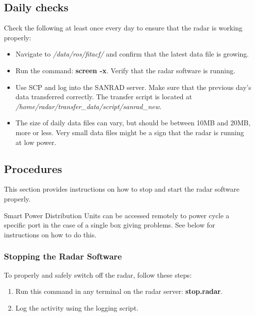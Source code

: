 \clearpage

\subsection{Daily checks}
\label{subsec:ops_dailychecks}
Check the following at least once every day to ensure that the radar is working properly:
\begin{itemize}
	\item Navigate to \textit{/data/ros/fitacf/} and confirm that the latest data file is growing.
	\item Run the command: \textbf{screen -x}. Verify that the radar software is running.
	\item Use SCP and log into the SANRAD server. Make sure that the previous day's data transferred correctly. The transfer script is located at \textit{/home/radar/transfer\_data/script/sanrad\_new}.
	\item The size of daily data files can vary, but should be between 10MB and 20MB, more or less. Very small data files might be a sign that the radar is running at low power.
\end{itemize}

\clearpage

\subsection{Procedures}
\label{subsec:ops_procedures}
This section provides instructions on how to stop and start the radar software properly.
\par
Smart Power Distribution Units can be accessed remotely to power cycle a specific port in the case of a single box giving problems. See below for instructions on how to do this.

\subsubsection{Stopping the Radar Software}
To properly and safely switch off the radar, follow these steps:
\begin{enumerate}
	\item Run this command in any terminal on the radar server: \textbf{stop.radar}.
	\item Log the activity using the logging script.
\end{enumerate}

